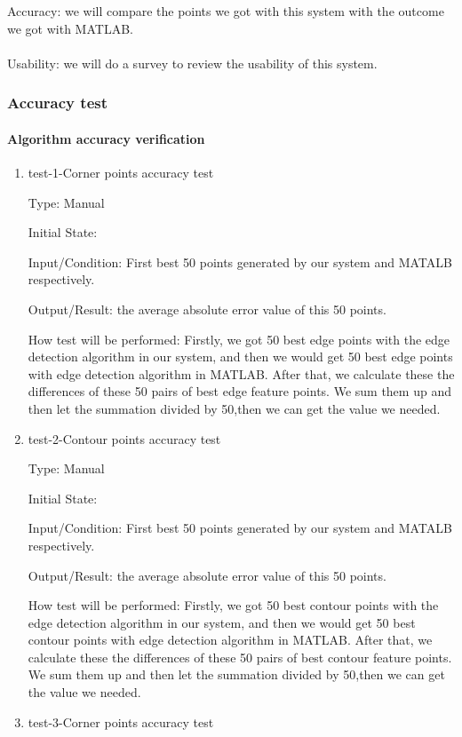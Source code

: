 \documentclass[12pt, titlepage]{article}
\begin{document}
Accuracy: we will compare the points we got with this system with the outcome we got with MATLAB.\\\\
Usability: we will do a survey to review the usability of this system.\\

\subsubsection{Accuracy test}
		
\paragraph{Algorithm accuracy verification}

\begin{enumerate}

\item{test-1-Corner points accuracy test\\}

Type: Manual
					
Initial State: 
					
Input/Condition: First best 50 points generated by our system and MATALB respectively.
					
Output/Result: the average absolute error value of this 50 points.
					
How test will be performed: Firstly, we got 50 best edge points with the edge detection algorithm in our system, and then we would get 50 best edge points with edge detection algorithm in MATLAB. After that, we calculate these the differences of these 50 pairs of best edge feature points. We sum them up and then let the summation divided by 50,then we can get the value we needed.
					
\item{test-2-Contour points accuracy test\\}

Type: Manual
					
Initial State: 
					
Input/Condition: First best 50 points generated by our system and MATALB respectively.
					
Output/Result: the average absolute error value of this 50 points.
					
How test will be performed: Firstly, we got 50 best contour points with the edge detection algorithm in our system, and then we would get 50 best contour points with edge detection algorithm in MATLAB. After that, we calculate these the differences of these 50 pairs of best contour feature points. We sum them up and then let the summation divided by 50,then we can get the value we needed.
\item{test-3-Corner points accuracy test\\}


\end{enumerate}
\end{document}

